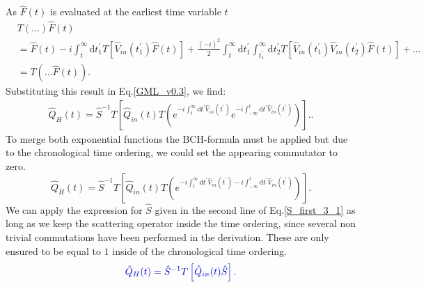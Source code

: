 \documentclass[12pt, titlepage]{article}
\begin{document}
As $ \hat{F}(t) $ is evaluated at the earliest time variable $ t $ 
\begin{equation}\label{Move_in_T_from_right}
\begin{split}
& T
\left( 
\ldots
\right)
\hat{F}(t)
\\
&=
\hat{F}(t)\!
-\!
i\!
\int_{t}^{\infty}\! \!\mathrm{d}t^{\prime}_{1}
 T
 \left[ 
 \hat{V}_{in}(t^{\prime}_{1})
 \hat{F}(t)
 \right] \!
+\!
\frac{(-i)^{2}}{2}\!\!
\int_{t}^{\infty}\!  \mathrm{d}t^{\prime}_{1}
\int_{t^{\prime}_{1}}^{\infty}\!\!\mathrm{d}t^{\prime}_{2}
 T
 \left[ 
 \hat{V}_{in}(t^{\prime}_{1})\hat{V}_{in}(t^{\prime}_{2})
\hat{F}(t) 
 \right] 
+\ldots
\\
&=
T\left( 
\ldots
\hat{F}(t)
\right)
.
\end{split}
\end{equation} 
Substituting this result in Eq.\enskip\eqref{GML_v0.3}, we find:
\begin{equation}
\begin{split}
\hat{Q}_{H}(t)
=
\hat{S}^{-1} 
T
\left[
\hat{Q}_{in}(t)
T
\left( 
 e^{-i\int_{t}^{\infty}\mathrm{d}t^{\prime} \hat{V}_{in}(t^{\prime})}
 e^{-i\int_{-\infty}^{t}\mathrm{d}t^{\prime} \hat{V}_{in}(t^{\prime})}
\right) 
\right] .
.
\end{split}
\end{equation}
To merge both exponential functions the BCH-formula must be applied but due to the chronological time ordering, we could set the appearing commutator to zero.
\begin{equation}\label{3rd_expression_for_Omega_H}
\hat{Q}_{H}(t)
=
\hat{S}^{-1} 
T
\left[
\hat{Q}_{in}(t)
T
\left( 
 e^{-i\int_{t}^{\infty}\mathrm{d}t^{\prime} \hat{V}_{in}(t^{\prime})-i\int_{-\infty}^{t}\mathrm{d}t^{\prime} \hat{V}_{in}(t^{\prime})}
\right) 
\right] .
\end{equation}
We can apply the expression for $ \hat{S} $ given in the second line of Eq.\enskip\eqref{S_first_3_1} as long as we keep the scattering operator inside the time ordering, since several non trivial commutations have been performed in the derivation. These are only ensured to be equal to $ 1 $ inside of the chronological time ordering. 
 \begin{equation}\label{Gell_Mann-Low_for_one_Q}
\begin{split}
 \textcolor[RGB]{0,0,204}{
\hat{Q}_{H}(t)
=
\hat{S}^{-1} 
T
\left[ 
\hat{Q}_{in}(t)
\hat{S}
\right]
.
}
\end{split}
\end{equation}
\end{document}
